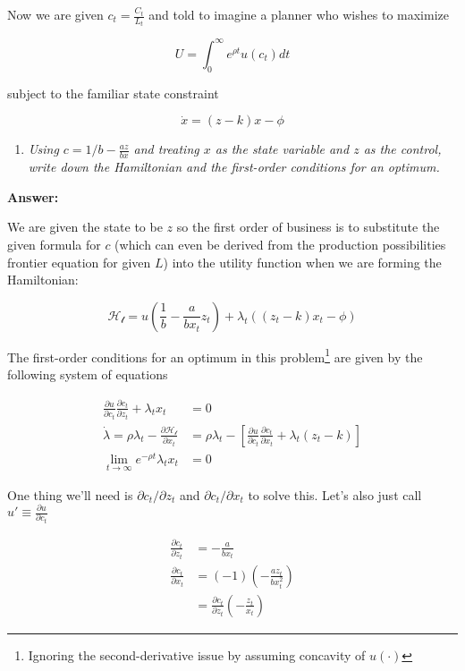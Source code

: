 \documentclass[
]{article}
\providecommand{\tightlist}{%
  \setlength{\itemsep}{0pt}\setlength{\parskip}{0pt}}
\begin{document}
Now we are given \(c_t = \frac{C_t}{L_t}\) and told to imagine a planner
who wishes to maximize

\[U = \int^{\infty}_{0} e^{\rho t} u(c_t) dt\]

subject to the familiar state constraint

\[ \dot{x} = (z-k)x - \phi\]

\begin{enumerate}
\def\labelenumi{\arabic{enumi}.}
\tightlist
\item
  \emph{Using \(c = 1/b - \frac{az}{bx}\) and treating \(x\) as the
  state variable and \(z\) as the control, write down the Hamiltonian
  and the first-order conditions for an optimum.}
\end{enumerate}

\textbf{Answer:}

We are given the state to be \(z\) so the first order of business is to
substitute the given formula for \(c\) (which can even be derived from
the production possibilities frontier equation for given \(L\)) into the
utility function when we are forming the Hamiltonian:

\[ \mathcal{H_t} = u\left(\frac{1}{b} - \frac{a}{bx_t}z_t \right) + \lambda_t((z_t-k)x_t - \phi)\]

The first-order conditions for an optimum in this problem\footnote{Ignoring
  the second-derivative issue by assuming concavity of \(u(\cdot)\)} are
given by the following system of equations

\begin{align}

\frac{\partial u}{\partial c_t}\frac{\partial c_t}{\partial z_t} + \lambda_t x_t &= 0 \\

\dot{\lambda} = \rho \lambda_t - \frac{\partial \mathcal{H_t}}{\partial x_t} &= \rho \lambda_t - \left[\frac{\partial u}{\partial c_t}\frac{\partial c_t}{\partial x_t} + \lambda_t (z_t - k) \right] \\

\lim_{t \to \infty} e^{-\rho t}\lambda_t x_t &= 0 

\end{align}

One thing we'll need is \(\partial c_t/\partial z_t\) and
\(\partial c_t/\partial x_t\) to solve this. Let's also just call
\(u' \equiv \frac{\partial u}{\partial c_t}\)

\begin{align}

\frac{\partial c_t}{\partial z_t} &= -\frac{a}{bx_t} \\
\frac{\partial c_t}{\partial x_t} &= (-1)\left(-\frac{az_t}{bx_t^2}\right)  \\
&= \frac{\partial c_t}{\partial z_t}\left(-\frac{z_t}{x_t}\right)

\end{align}
\end{document}
